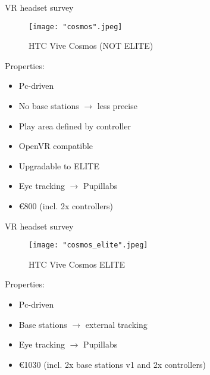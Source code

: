 \documentclass{beamer}
\begin{document}
\begin{frame}{VR headset survey}
	\begin{figure}
		\texttt{[image: "cosmos".jpeg]}
		\caption{HTC Vive Cosmos (NOT ELITE)}
	\end{figure}
	
	Properties:
	\begin{itemize}
	\item Pc-driven
	\item No base stations $\rightarrow$ less precise
  	\item Play area defined by controller
  	\item OpenVR compatible
	\item Upgradable to ELITE
	\item Eye tracking $\rightarrow$ Pupillabs
	\item €800 (incl. 2x controllers)
\end{itemize}
\end{frame}

\begin{frame}{VR headset survey}
	\begin{figure}
		\texttt{[image: "cosmos\_elite".jpeg]}
		\caption{HTC Vive Cosmos ELITE}
	\end{figure}
	
	Properties:
	\begin{itemize}
		\item Pc-driven
		\item Base stations $\rightarrow$ external tracking
		\item Eye tracking $\rightarrow$ Pupillabs
		\item €1030 (incl. 2x base stations v1 and 2x controllers)
	\end{itemize}
\end{frame}
\end{document}
